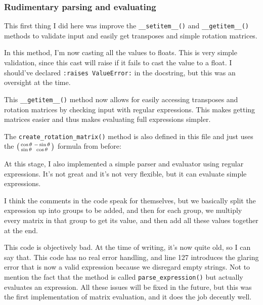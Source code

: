 \documentclass[../development.tex]{subfiles}
\begin{document}
\subsubsection{Rudimentary parsing and evaluating\label{development:matrices-backend:rudimentary-parsing-and-evaluating}}

This first thing I did here was improve the \texttt{__setitem__()} and \texttt{__getitem__()} methods to validate input and easily get transposes and simple rotation matrices.


In this method, I'm now casting all the values to floats. This is very simple validation, since this cast will raise  if it fails to cast the value to a float. I should've declared \texttt{:raises ValueError:} in the docstring, but this was an oversight at the time.


This \texttt{__getitem__()} method now allows for easily accessing transposes and rotation matrices by checking input with regular expressions. This makes getting matrices easier and thus makes evaluating full expressions simpler.

The \texttt{create_rotation_matrix()} method is also defined in this file and just uses the $\begin{psmallmatrix}\cos\theta & -\sin\theta\\\sin\theta & \cos\theta\end{psmallmatrix}$ formula from before:


At this stage, I also implemented a simple parser and evaluator using regular expressions. It's not great and it's not very flexible, but it can evaluate simple expressions.


I think the comments in the code speak for themselves, but we basically split the expression up into groups to be added, and then for each group, we multiply every matrix in that group to get its value, and then add all these values together at the end.

This code is objectively bad. At the time of writing, it's now quite old, so I can say that. This code has no real error handling, and line 127 introduces the glaring error that  is now a valid expression because we disregard empty strings. Not to mention the fact that the method is called \texttt{parse_expression()} but actually evaluates an expression. All these issues will be fixed in the future, but this was the first implementation of matrix evaluation, and it does the job decently well.
\end{document}
